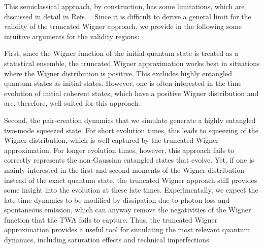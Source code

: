 \begin{bibunit}
This semiclassical approach, by construction, has some limitations, which are discussed in detail in Refs.~\cite{Sinatra2002,Blakie2008,Lewis-Swan2016}. Since it is difficult to derive a general limit for the validity of the truncated Wigner approach, we provide in the following some intuitive arguments for the validity regions:

First, since the Wigner function of the initial quantum state is treated as a statistical ensemble, the truncated Wigner approximation works best in situations where the Wigner distribution is positive. This excludes highly entangled quantum states as initial states. However, one is often interested in the time evolution of initial coherent states, which have a positive Wigner distribution and are, therefore, well suited for this approach.

Second, the pair-creation dynamics that we simulate generate a highly entangled two-mode squeezed state. For short evolution times, this leads to squeezing of the Wigner distribution, which is well captured by the truncated Wigner approximation. For longer evolution times, however, this approach fails to correctly represents the non-Gaussian entangled states that evolve. Yet, if one is mainly interested in the first and second moments of the Wigner distribution instead of the exact quantum state, the truncated Wigner approach still provides some insight into the evolution at these late times. Experimentally, we expect the late-time dynamics to be modified by dissipation due to photon loss and spontaneous emission, which can anyway remove the negativities of the Wigner function that the TWA fails to capture. Thus, the truncated Wigner approximation provides a useful tool for simulating the most relevant quantum dynamics, including saturation effects and technical imperfections.

\end{bibunit}
